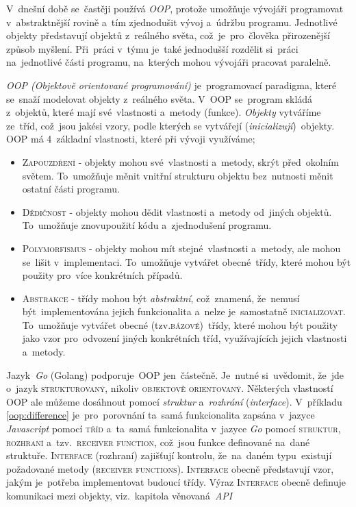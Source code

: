 \documentclass[14pt,a4paper]{article}
\begin{document}
        V~dnešní době se~častěji používá \emph{OOP}, protože umožňuje vývojáři programovat v~abstraktnější rovině a~tím zjednodušit vývoj a~údržbu programu. Jednotlivé objekty představují  objektů z~reálného světa, což~je~pro~člověka přirozenější způsob myšlení. Při~práci v~týmu je~také jednodušší rozdělit si~práci na~jednotlivé části programu, na~kterých mohou vývojáři pracovat paralelně.
        
        \emph{OOP (Objektově orientované programování)} je~programovací paradigma, které se~snaží modelovat objekty z~reálného světa. V~OOP se~program skládá z~objektů, které mají své~vlastnosti a~metody (funkce). \emph{Objekty} vytváříme ze~tříd, což~jsou jakési vzory, podle kterých se vytvářejí (\emph{inicializují})~objekty. \textsc{OOP} má 4~základní vlastnosti, které při vývoji využíváme; \cite{Keogh:OOP}
        \begin{itemize}
            \item \textsc{Zapouzdření} - objekty mohou své~vlastnosti a~metody, skrýt před~okolním světem. To~umožňuje měnit vnitřní strukturu objektu bez~nutnosti měnit ostatní části programu.
            \item \textsc{Dědičnost} - objekty mohou dědit vlastnosti a~metody od~jiných objektů. To~umožňuje znovupoužití kódu a~zjednodušení programu.
            \item \textsc{Polymorfismus} - objekty mohou mít stejné~vlastnosti a~metody, ale mohou se~lišit v~implementaci. To~umožňuje vytvářet obecné~třídy, které mohou být použity pro~více konkrétních případů.
            \item \textsc{Abstrakce} - třídy mohou být \emph{abstraktní}, což~znamená, že~nemusí být~implementována jejich funkcionalita a~nelze je~samostatně \textsc{inicializovat}. To~umožňuje vytvářet obecné (tzv.\textsc{bázové})~třídy, které mohou být použity jako vzor pro~odvození jiných konkrétních tříd, využívajících jejich vlastnosti a~metody.
        \end{itemize}

        Jazyk~\emph{Go} (Golang) podporuje~\textsc{OOP} jen~částečně. Je~nutné si~uvědomit, že~jde o~jazyk \textsc{strukturovaný}, nikoliv \textsc{objektově orientovaný}. Některých vlastností \textsc{OOP} ale můžeme dosáhnout pomocí \emph{struktur} a~\emph{rozhrání} (\emph{interface}). \cite{go:OOP}
        V~příkladu \ref{oop:difference} je~pro~porovnání ta~samá funkcionalita zapsána v~jazyce \emph{Javascript} pomocí \textsc{tříd} a~ta~samá funkcionalita v~jazyce \emph{Go} pomocí \textsc{struktur}, \textsc{rozhraní} a~tzv.~\textsc{receiver function}, což~jsou funkce definované na~dané struktuře. \textsc{Interface} (rozhraní) zajišťují kontrolu, že~na~daném typu~existují požadované metody (\textsc{receiver functions}).
        \textsc{Interface} obecně představují vzor, jakým je~potřeba implementovat budoucí třídy. Výraz \textsc{Interface} obecně definuje komunikaci mezi objekty, viz.~kapitola věnovaná~\emph{API}
\end{document}
